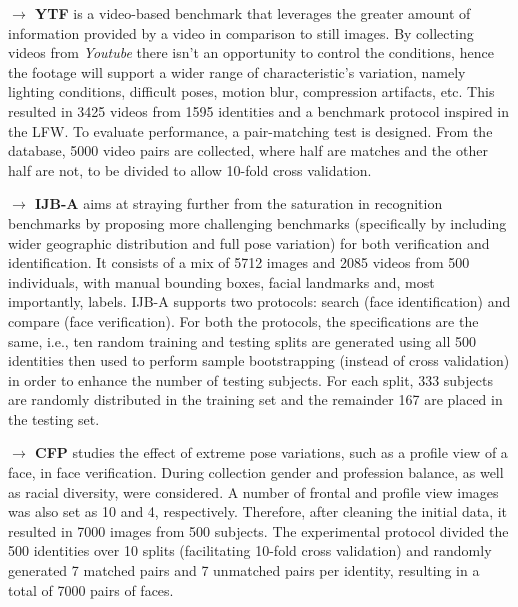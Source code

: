 \documentclass[class=report, crop=false, a4paper, 12pt]{standalone}
\begin{document}
\vspace{0.7\baselineskip}
\noindent\textbf{$\rightarrow$ YTF} \autocite{wolfFaceRecognitionUnconstrained2011} is a video-based benchmark that leverages the greater amount of information provided by a video in comparison to still images. By collecting videos from \textit{Youtube} there isn't an opportunity to control the conditions, hence the footage will support a wider range of characteristic's variation, namely lighting conditions, difficult poses, motion blur, compression artifacts, etc. This resulted in 3425 videos from 1595 identities and a benchmark protocol inspired in the LFW. To evaluate performance, a pair-matching test is designed. From the database, 5000 video pairs are collected, where half are matches and the other half are not, to be divided to allow 10-fold cross validation.

\vspace{0.7\baselineskip}
\noindent\textbf{$\rightarrow$ IJB-A} \autocite{klarePushingFrontiersUnconstrained2015} aims at straying further from the saturation in recognition benchmarks by proposing more challenging benchmarks (specifically by including wider geographic distribution and full pose variation) for both verification and identification. It consists of a mix of 5712 images and 2085 videos from 500 individuals, with manual bounding boxes, facial landmarks and, most importantly, labels. IJB-A supports two protocols: search (face identification) and compare (face verification). For both the protocols, the specifications are the same, i.e., ten random training and testing splits are generated using all 500 identities then used to perform sample bootstrapping (instead of cross validation) in order to enhance the number of testing subjects. For each split, 333 subjects are randomly distributed in the training set and the remainder 167 are placed in the testing set.

\vspace{0.7\baselineskip}
\noindent\textbf{$\rightarrow$ CFP} \autocite{senguptaFrontalProfileFace2016} studies the effect of extreme pose variations, such as a profile view of a face, in face verification. During collection gender and profession balance, as well as racial diversity, were considered. A number of frontal and profile view images was also set as 10 and 4, respectively. Therefore, after cleaning the initial data, it resulted in 7000 images from 500 subjects. The experimental protocol divided the 500 identities over 10 splits (facilitating 10-fold cross validation) and randomly generated 7 matched pairs and 7 unmatched pairs per identity, resulting in a total of 7000 pairs of faces.
\end{document}
